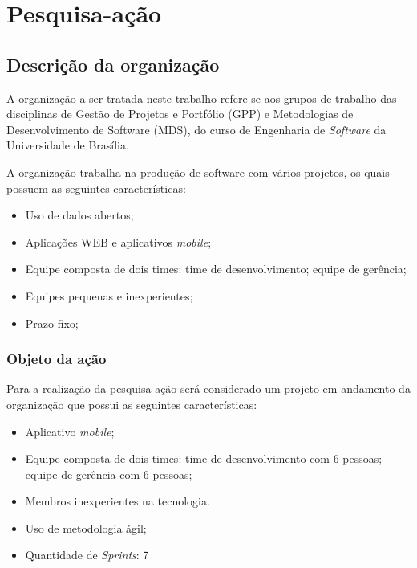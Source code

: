 \chapter{Pesquisa-ação}
\label{pesquisa_acao}
	\section{Descrição da organização}

		A organização a ser tratada neste trabalho refere-se aos grupos de trabalho das disciplinas de Gestão de Projetos 
		e Portfólio (GPP) e Metodologias de Desenvolvimento de Software (MDS), do curso de Engenharia de \textit{Software} 
		da Universidade de Brasília.

		A organização trabalha na produção de software com vários projetos, os quais possuem as seguintes características:

		\begin{itemize}
			\item Uso de dados abertos;
			\item Aplicações WEB e aplicativos \textit{mobile};
			\item Equipe composta de dois times:
				 time de desenvolvimento;
				 equipe de gerência;
			\item Equipes pequenas e inexperientes;
			\item Prazo fixo;
		\end{itemize}

		\subsection{Objeto da ação}

		Para a realização da pesquisa-ação será considerado um projeto em andamento da organização que possui as seguintes características:


		\begin{itemize}
			\item Aplicativo \textit{mobile};
			\item Equipe composta de dois times:
				 time de desenvolvimento com 6 pessoas;
				 equipe de gerência com 6 pessoas;
			\item Membros inexperientes na tecnologia.
			\item Uso de metodologia ágil;
			\item Quantidade de \textit{Sprints}: 7
		\end{itemize}



